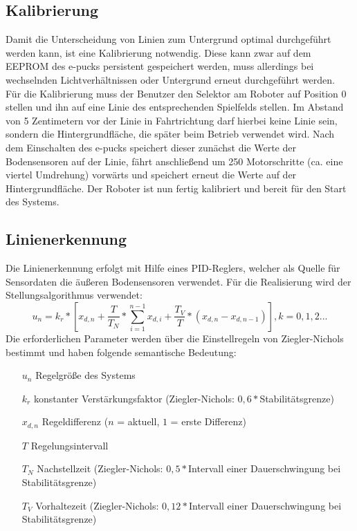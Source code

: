 \documentclass[10pt,a4paper]{article}
\begin{document}
		\subsection{Kalibrierung}
			Damit die Unterscheidung von Linien zum Untergrund optimal durchgeführt werden kann, ist eine Kalibrierung notwendig. Diese kann
			zwar auf dem EEPROM des e-pucks persistent gespeichert werden, muss allerdings bei wechselnden Lichtverhältnissen oder Untergrund
			erneut durchgeführt werden. \\
			Für die Kalibrierung muss der Benutzer den Selektor am Roboter auf Position 0 stellen und ihn auf eine Linie des entsprechenden
			Spielfelds stellen. Im Abstand von 5 Zentimetern vor der Linie in Fahrtrichtung darf hierbei keine Linie sein, sondern die
			Hintergrundfläche, die später beim Betrieb verwendet wird. Nach dem Einschalten des e-pucks speichert dieser zunächst die Werte der
			Bodensensoren auf der Linie, fährt anschließend um 250 Motorschritte (ca. eine viertel Umdrehung) vorwärts und speichert erneut
			die Werte auf der Hintergrundfläche. Der Roboter ist nun fertig kalibriert und bereit für den Start des Systems.
		\subsection{Linienerkennung}
			Die Linienerkennung erfolgt mit Hilfe eines PID-Reglers, welcher als Quelle für Sensordaten die äußeren Bodensensoren verwendet.
			Für die Realisierung wird der Stellungsalgorithmus verwendet:
			\begin{equation}
				u_n = k_r * \left[ x_{d,n} + \frac{T}{T_N} * \sum_{i=1}^{n-1}x_{d,i} + \frac{T_V}{T}*(x_{d,n}-x_{d,n-1}) \right], k=0,1,2...
			\end{equation}
			Die erforderlichen Parameter werden über die Einstellregeln von Ziegler-Nichols bestimmt und haben folgende semantische Bedeutung:
			\begin{itemize}
				\item[$u_n$] Regelgröße des Systems
				\item[$k_r$] konstanter Verstärkungsfaktor (Ziegler-Nichols: $0,6 * $Stabilitätsgrenze)
				\item[$x_{d,n}$] Regeldifferenz ($n$ = aktuell, $1$ = erste Differenz)
				\item[$T$] Regelungsintervall
				\item[$T_N$] Nachstellzeit (Ziegler-Nichols: $0,5 * $Intervall einer Dauerschwingung bei Stabilitätsgrenze)
				\item[$T_V$] Vorhaltezeit (Ziegler-Nichols: $0,12 * $Intervall einer Dauerschwingung bei Stabilitätsgrenze)
			\end{itemize}		
\end{document}
